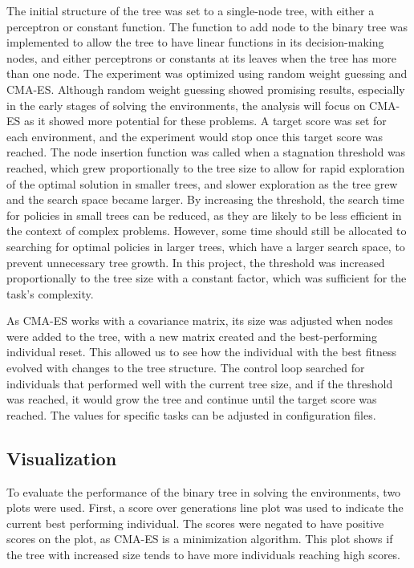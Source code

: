 The initial structure of the tree was set to a single-node tree, with either a perceptron or constant function. The function to add node to the binary tree was implemented to allow the tree to have linear functions in its decision-making nodes, and either perceptrons or constants at its leaves when the tree has more than one node. The experiment was optimized using random weight guessing and CMA-ES. Although random weight guessing showed promising results, especially in the early stages of solving the environments, the analysis will focus on CMA-ES as it showed more potential for these problems. A target score was set for each environment, and the experiment would stop once this target score was reached. The node insertion function was called when a stagnation threshold was reached, which grew proportionally to the tree size to allow for rapid exploration of the optimal solution in smaller trees, and slower exploration as the tree grew and the search space became larger. By increasing the threshold, the search time for policies in small trees can be reduced, as they are likely to be less efficient in the context of complex problems. However, some time should still be allocated to searching for optimal policies in larger trees, which have a larger search space, to prevent unnecessary tree growth. In this project, the threshold was increased proportionally to the tree size with a constant factor, which was sufficient for the task's complexity.

As CMA-ES works with a covariance matrix, its size was adjusted when nodes were added to the tree, with a new matrix created and the best-performing individual reset. This allowed us to see how the individual with the best fitness evolved with changes to the tree structure. The control loop searched for individuals that performed well with the current tree size, and if the threshold was reached, it would grow the tree and continue until the target score was reached. The values for specific tasks can be adjusted in configuration files.

\subsection{Visualization}
\label{visualization}
To evaluate the performance of the binary tree in solving the environments, two plots were used. First, a score over generations line plot was used to indicate the current best performing individual. The scores were negated to have positive scores on the plot, as CMA-ES is a minimization algorithm. This plot shows if the tree with increased size tends to have more individuals reaching high scores.

